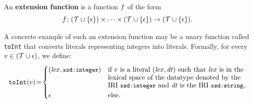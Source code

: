 \begin{definition}
	\label{def:ExtensionFunction}
	\normalfont
		An \textbf{extension function} is a function $f$ of the form
\vspace{-2mm} %
		$$f \!: (\mathcal{T} \cup \{\epsilon\}) \times \dots \times (\mathcal{T} \cup \{\epsilon\}) \rightarrow (\mathcal{T} \cup \{\epsilon\}).$$
\end{definition}

\begin{example}
	\label{ex:ExtensionFunction:toInt}
	A concrete example of such an extension function may be a unary function called \texttt{toInt} that converts  literals representing integers into  literals. Formally, for every $v \in (\mathcal{T} \cup \epsilon)$, we define:%
%
\vspace{-2mm} %
%
	\begin{equation*}
		\texttt{toInt}(v) \!=\!
		\begin{cases}
			(\mathit{lex}, \texttt{\small xsd:integer})
			& \text{if $v$ is a literal $(\mathit{lex}, \mathit{dt})$ such that $\mathit{lex}$ is in the}
			\\[-1mm]
			& \text{lexical space of the datatype denoted by the}
			\\[-1mm]
			& \text{IRI \texttt{\small xsd:integer} and $\mathit{dt}$ is the IRI \texttt{\small xsd:string},}
			\\
			\epsilon
			& \text{else.}
		\end{cases}
	\end{equation*}
\end{example}




